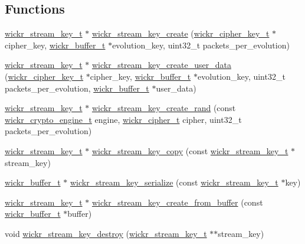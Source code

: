 \subsection*{Functions}
\begin{DoxyCompactItemize}
\item 
\mbox{\hyperlink{structwickr__stream__key}{wickr\+\_\+stream\+\_\+key\+\_\+t}} $\ast$ \mbox{\hyperlink{group__wickr__stream__key_ga54449667a25d9e64cd04dae58dd76418}{wickr\+\_\+stream\+\_\+key\+\_\+create}} (\mbox{\hyperlink{structwickr__cipher__key}{wickr\+\_\+cipher\+\_\+key\+\_\+t}} $\ast$cipher\+\_\+key, \mbox{\hyperlink{structwickr__buffer}{wickr\+\_\+buffer\+\_\+t}} $\ast$evolution\+\_\+key, uint32\+\_\+t packets\+\_\+per\+\_\+evolution)
\item 
\mbox{\hyperlink{structwickr__stream__key}{wickr\+\_\+stream\+\_\+key\+\_\+t}} $\ast$ \mbox{\hyperlink{group__wickr__stream__key_gaff8e766f3519e9e73157938bd1d3e024}{wickr\+\_\+stream\+\_\+key\+\_\+create\+\_\+user\+\_\+data}} (\mbox{\hyperlink{structwickr__cipher__key}{wickr\+\_\+cipher\+\_\+key\+\_\+t}} $\ast$cipher\+\_\+key, \mbox{\hyperlink{structwickr__buffer}{wickr\+\_\+buffer\+\_\+t}} $\ast$evolution\+\_\+key, uint32\+\_\+t packets\+\_\+per\+\_\+evolution, \mbox{\hyperlink{structwickr__buffer}{wickr\+\_\+buffer\+\_\+t}} $\ast$user\+\_\+data)
\item 
\mbox{\hyperlink{structwickr__stream__key}{wickr\+\_\+stream\+\_\+key\+\_\+t}} $\ast$ \mbox{\hyperlink{group__wickr__stream__key_ga9e95dd486dbe2f3db647c65042601b34}{wickr\+\_\+stream\+\_\+key\+\_\+create\+\_\+rand}} (const \mbox{\hyperlink{structwickr__crypto__engine}{wickr\+\_\+crypto\+\_\+engine\+\_\+t}} engine, \mbox{\hyperlink{structwickr__cipher}{wickr\+\_\+cipher\+\_\+t}} cipher, uint32\+\_\+t packets\+\_\+per\+\_\+evolution)
\item 
\mbox{\hyperlink{structwickr__stream__key}{wickr\+\_\+stream\+\_\+key\+\_\+t}} $\ast$ \mbox{\hyperlink{group__wickr__stream__key_ga0201dd73adf773834d7dbb4bbc307fae}{wickr\+\_\+stream\+\_\+key\+\_\+copy}} (const \mbox{\hyperlink{structwickr__stream__key}{wickr\+\_\+stream\+\_\+key\+\_\+t}} $\ast$stream\+\_\+key)
\item 
\mbox{\hyperlink{structwickr__buffer}{wickr\+\_\+buffer\+\_\+t}} $\ast$ \mbox{\hyperlink{group__wickr__stream__key_gae1540c98a88e2f62e96fb2ee209e2290}{wickr\+\_\+stream\+\_\+key\+\_\+serialize}} (const \mbox{\hyperlink{structwickr__stream__key}{wickr\+\_\+stream\+\_\+key\+\_\+t}} $\ast$key)
\item 
\mbox{\hyperlink{structwickr__stream__key}{wickr\+\_\+stream\+\_\+key\+\_\+t}} $\ast$ \mbox{\hyperlink{group__wickr__stream__key_gadf1565329fed927531e1a14334ed23e4}{wickr\+\_\+stream\+\_\+key\+\_\+create\+\_\+from\+\_\+buffer}} (const \mbox{\hyperlink{structwickr__buffer}{wickr\+\_\+buffer\+\_\+t}} $\ast$buffer)
\item 
void \mbox{\hyperlink{group__wickr__stream__key_ga3bb3dec760c5b7f3a1bd2d0bb13bcc79}{wickr\+\_\+stream\+\_\+key\+\_\+destroy}} (\mbox{\hyperlink{structwickr__stream__key}{wickr\+\_\+stream\+\_\+key\+\_\+t}} $\ast$$\ast$stream\+\_\+key)
\end{DoxyCompactItemize}


